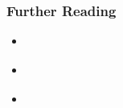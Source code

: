 \documentclass{beamer}
\begin{document}
\appendix
\begin{frame}
  \frametitle{Further Reading}
  \begin{itemize}
    \item \href{http://matt.might.net/articles/}{%
      \color{blue}{Matt Might's blog}
    }
    \item \href{http://pgbovine.net/phd.htm}{%
      \color{blue}{Philip Guo's articles}
    }
    \item \href{http://pgbovine.net/PhD-memoir.htm}{%
    }
  \end{itemize}
\end{frame}
\end{document}
